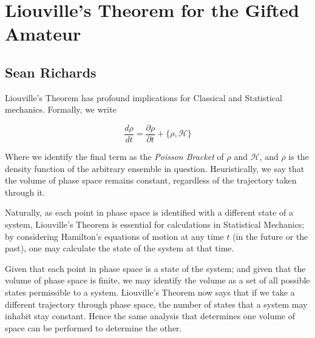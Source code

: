 \section{Liouville's Theorem for the Gifted Amateur}
\subsection*{Sean Richards}

Liouville's Theorem has profound implications for Classical and 
Statistical mechanics. Formally, we write

$$\frac{d\rho}{dt}=\frac{\partial\rho}{\partial t}+\{\rho, 
\mathcal{H}\}$$

Where we identify the final term as the \textit{Poisson Bracket} of 
$\rho$ and $\mathcal{H}$, and $\rho$ is the density function of the 
arbitrary ensemble in question. Heuristically, we say that the volume of 
phase space remains constant, regardless of the trajectory taken through 
it.

Naturally, as each point in phase space is identified with a different 
state of a system, Liouville's Theorem is essential for calculations in 
Statistical Mechanics; by considering Hamilton's equations of motion at 
any time $t$ (in the future or the past), one may calculate the state of 
the system at that time.

Given that each point in phase space is a state of the system; and given 
that the volume of phase space is finite, we may identify the volume as 
a set of all possible states permissible to a system. Liouville's 
Theorem now says that if we take a different trajectory through phase 
space, the number of states that a system may inhabit stay constant. 
Hence the same analysis that determines one volume of space can be 
performed to determine the other.
